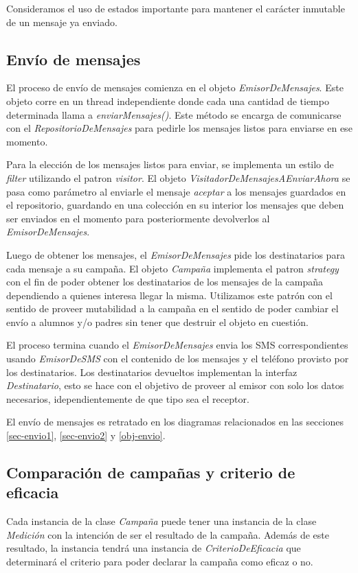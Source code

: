 \documentclass[a4paper, 10pt, twoside]{article}
\begin{document}
Consideramos el uso de estados importante para mantener el carácter inmutable de un mensaje ya enviado.

\subsection{Envío de mensajes}
El proceso de envío de mensajes comienza en el objeto \textit{EmisorDeMensajes}. 
Este objeto corre en un thread independiente donde cada una cantidad de tiempo determinada 
llama a \textit{enviarMensajes()}. Este método se encarga de comunicarse con el \textit{RepositorioDeMensajes}
para pedirle los mensajes listos para enviarse en ese momento.

Para la elección de los mensajes listos para enviar, se implementa un estilo de \textit{filter} utilizando el
patron \textit{visitor}. El objeto \textit{VisitadorDeMensajesAEnviarAhora} se pasa como parámetro al enviarle
el mensaje \textit{aceptar} a los mensajes guardados en el repositorio, guardando en una colección en su interior
los mensajes que deben ser enviados en el momento para posteriormente devolverlos al \textit{EmisorDeMensajes}.

Luego de obtener los mensajes, el \textit{EmisorDeMensajes} pide los destinatarios para cada mensaje a su campaña.
El objeto \textit{Campaña} implementa el patron \textit{strategy} con el fin de poder obtener los destinatarios de 
los mensajes de la campaña dependiendo a quienes interesa llegar la misma. Utilizamos este patrón con el sentido de 
proveer mutabilidad a la campaña en el sentido de poder cambiar el envío a alumnos y/o padres sin tener que destruir 
el objeto en cuestión.

El proceso termina cuando el \textit{EmisorDeMensajes} envia los SMS correspondientes usando \textit{EmisorDeSMS} 
con el contenido de los mensajes y el teléfono provisto por los destinatarios. Los destinatarios devueltos 
implementan la interfaz \textit{Destinatario}, esto se hace con el objetivo de proveer al emisor con solo los 
datos necesarios, idependientemente de que tipo sea el receptor.

El envío de mensajes es retratado en los diagramas relacionados en las secciones \ref{sec-envio1}, \ref{sec-envio2} y 
\ref{obj-envio}.

\subsection{Comparación de campañas y criterio de eficacia}
Cada instancia de la clase \textit{Campaña} puede tener una instancia de la clase \textit{Medición} con la intención 
de ser el resultado de la campaña. Además de este resultado, la instancia tendrá una instancia de 
\textit{CriterioDeEficacia} que determinará el criterio para poder declarar la campaña como eficaz o no.
\end{document}
